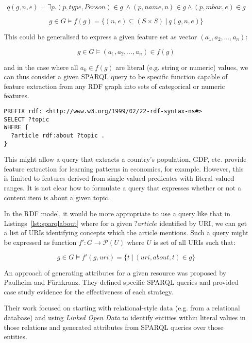 $$
q(g,n,e) = \exists p . (p, type, Person) \in g\ \land (p, name, n) \in g \land (p, mbox, e) \in g
$$

$$
g \in G \models f(g) = \{(n, e) \subseteq (S \times S) \: | \: q(g,n,e)\}
$$

This could be generalised to express a given feature set as
vector $(a_1, a_2, ..., a_n)$:

$$
g \in G \models (a_1, a_2, ..., a_n) \in f(g)
$$

\noindent and in the case where all $a_k \in f(g)$ are literal (e.g. string or
numeric) values, we can thus consider a given SPARQL query to be specific
function capable of feature extraction from any RDF graph into sets of
categorical or numeric features.

\begin{lstlisting}[label=lst:sparqlabout,caption={SPARQL query to determine what },language=sparql]
PREFIX rdf: <http://www.w3.org/1999/02/22-rdf-syntax-ns#>
SELECT ?topic
WHERE {
  ?article rdf:about ?topic .
}
\end{lstlisting}

This might allow a query that extracts a country's population, GDP, etc.
provide feature extraction for learning patterns in economics, for example.
However, this is limited to features derived from single-valued predicates
with literal-valued ranges. It is not clear how to formulate a query that
expresses whether or not a content item is about a given topic.

In the RDF
model, it would be more appropriate to use a query like that in
Listings~\ref{lst:sparqlabout} where for a given $?article$ identified by
URI, we can get a list of URIs identifying concepts which the article mentions.
Such a query might be expressed as function $f': G \rightarrow \mathcal P(U)$ where $U$ is
set of all URIs such that:

$$
g \in G \models f'(g, uri) = \{t \: | \: (uri, about, t) \in g\}
$$

An approach of generating attributes for a given resource was proposed by
Paulheim and F\"urnkranz\cite{paulheim2012unsupervised}. They defined specific
SPARQL queries and provided case study evidence for the effectiveness of
each strategy.

Their work focused on starting with relational-style data (e.g. from a
relational database) and using \emph{Linked Open Data} to identify entities
within literal values in those relations and generated attributes from
SPARQL queries over those entities.

